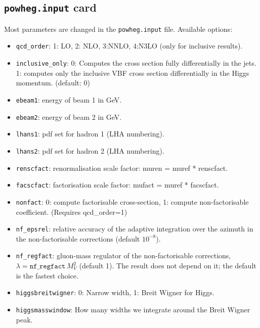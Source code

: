 \documentclass[12pt,a4]{article}
\begin{document}
\subsection{\texttt{powheg.input} card}
Most parameters are changed in the \texttt{powheg.input} file.
%
Available options:
\begin{itemize}
\item \texttt{qcd\_order}: 1: LO, 2: NLO, 3:NNLO, 4:N3LO (only for
  inclusive results).

\item \texttt{inclusive\_only}: 0: Computes the cross section fully
  differentially in the jets. 1: computes only the inclusive VBF cross
  section differentially in the Higgs momentum. (default: 0)

\item\texttt{ebeam1}: energy of beam 1 in GeV.
  
\item\texttt{ebeam2}: energy of beam 2 in GeV.

\item\texttt{lhans1}: pdf set for hadron 1 (LHA numbering).

\item\texttt{lhans2}: pdf set for hadron 2 (LHA numbering).

\item\texttt{renscfact}: renormalisation scale factor: muren = muref *
  renscfact.
  
\item\texttt{facscfact}: factorisation scale factor: mufact = muref *
  facscfact.
  
\item\texttt{nonfact}: 0: compute factorisable cross-section, 1: compute
  non-factorisable coefficient. (Requires qcd\_order=1)
  
\item\texttt{nf\_epsrel}: relative accuracy of the adaptive integration
  over the azimuth in the non-factorisable corrections (default
  $10^{-8}$).
  
\item\texttt{nf\_regfact}: gluon-mass regulator of the non-factorisable
  corrections, $\lambda = \texttt{nf\_regfact}\, M_V^2$ (default 1). The
  result does not depend on it; the default is the fastest choice.
  
\item\texttt{higgsbreitwigner}: 0: Narrow width, 1: Breit Wigner for Higgs.
  
\item\texttt{higgsmasswindow}: How many widths we integrate around the
  Breit Wigner peak.
  

\end{itemize}
\end{document}
